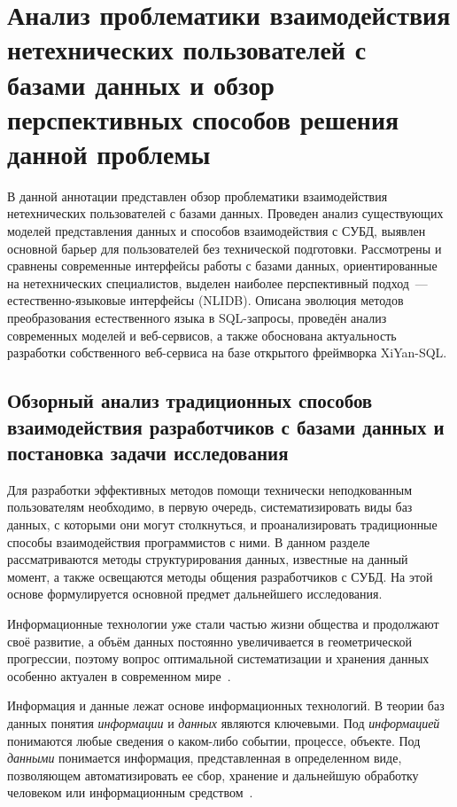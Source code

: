 \chapter{Анализ проблематики взаимодействия нетехнических пользователей
  с базами данных и обзор перспективных способов решения данной проблемы}
\label{chapter1}

\begin{annotation}
	В данной аннотации представлен обзор проблематики взаимодействия нетехнических пользователей
	с базами данных. Проведен анализ существующих моделей представления данных и способов
	взаимодействия с СУБД, выявлен основной барьер для пользователей без технической подготовки.
	Рассмотрены и сравнены современные интерфейсы работы с базами данных,
	ориентированные на нетехнических специалистов, выделен наиболее перспективный подход~---
	естественно-языковые интерфейсы (NLIDB). Описана эволюция методов преобразования
	естественного языка в SQL-запросы, проведён анализ современных моделей и веб-сервисов,
	а также обоснована актуальность разработки собственного веб-сервиса на базе открытого
	фреймворка XiYan-SQL.
\end{annotation}




\section{Обзорный анализ традиционных способов взаимодействия разработчиков с базами данных и
  постановка задачи исследования}%
\begin{annotation}
	Для разработки эффективных методов помощи технически неподкованным пользователям необходимо,
	в первую очередь, систематизировать виды баз данных, с которыми они могут столкнуться, и
	проанализировать традиционные способы взаимодействия программистов с ними.
	В данном разделе рассматриваются методы структурирования данных, известные на данный момент,
	а также освещаются методы общения разработчиков с СУБД. На этой основе формулируется
	основной предмет дальнейшего исследования.
\end{annotation}

Информационные технологии уже стали частью жизни общества и продолжают своё развитие,
а объём данных постоянно увеличивается в геометрической прогрессии,
поэтому вопрос оптимальной систематизации и хранения данных особенно
актуален в современном мире~\cite{savoskinIssledovanieSposobovPrimeneniya2019}.

Информация и данные лежат основе информационных технологий.
В теории баз данных понятия \textit{информации} и \textit{данных} являются ключевыми.
Под \textit{информацией} понимаются любые сведения о каком-либо событии, процессе, объекте.
Под \textit{данными} понимается информация, представленная в определенном виде,
позволяющем автоматизировать ее сбор, хранение и дальнейшую обработку человеком или
информационным средством~\cite{burakovVvedenie2010}.

